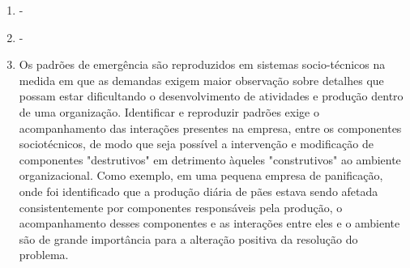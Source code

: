 \documentclass[article,a4paper]{abntex2}
\begin{document}
\begin{enumerate}
    \item -
    \item - 
    \item Os padrões de emergência são reproduzidos em sistemas socio-técnicos na medida em que as demandas exigem maior observação sobre detalhes que possam estar dificultando o desenvolvimento de atividades e produção dentro de uma organização. Identificar e reproduzir padrões exige o acompanhamento das interações presentes na empresa, entre os componentes sociotécnicos, de modo que seja possível a intervenção e modificação de componentes "destrutivos" em detrimento àqueles "construtivos" ao ambiente organizacional. Como exemplo, em uma pequena empresa de panificação, onde foi identificado que a produção diária de pães estava sendo afetada consistentemente por componentes responsáveis pela produção, o acompanhamento desses componentes e as interações entre eles e o ambiente são de grande importância para a alteração positiva da resolução do problema.
\end{enumerate}


\end{document}
